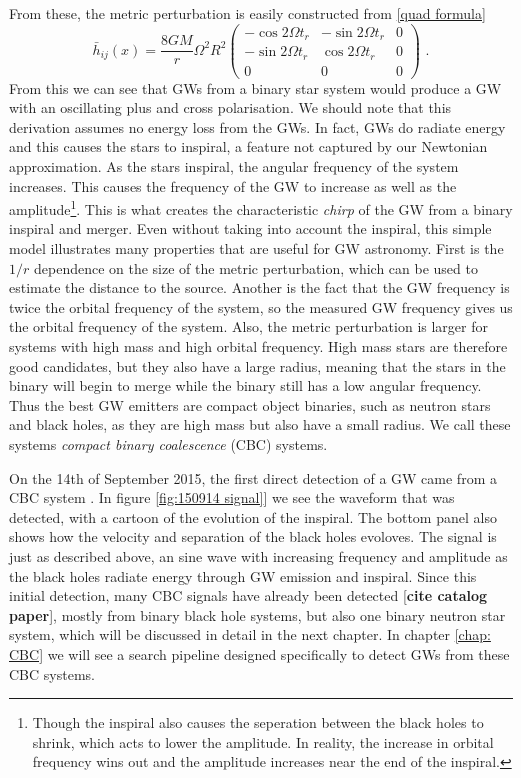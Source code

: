 \documentclass[11pt]{cuthesis}
\newcommand{\fs}{\text{ .}}
\begin{document}
From these, the metric perturbation is easily constructed from \ref{quad formula}
\[
\bar{h}_{ij} (x)
=
\frac{8GM}{r}\Omega^2 R^2\begin{pmatrix} 
 -\cos 2 \Omega t_r & -\sin 2 \Omega t_r & 0 \\
-\sin 2 \Omega t_r & \cos 2 \Omega t_r & 0 \\
0 & 0 & 0
\end{pmatrix}
\fs
\]
From this we can see that GWs from a binary star system would produce a GW with an oscillating plus and cross polarisation. We should note that this derivation assumes no energy loss from the GWs. In fact, GWs do radiate energy and this causes the stars to inspiral, a feature not captured by our Newtonian approximation. As the stars inspiral, the angular frequency of the system increases. This causes the frequency of the GW to increase as well as the amplitude\footnote{Though the inspiral also causes the seperation between the black holes to shrink, which acts to lower the amplitude. In reality, the increase in orbital frequency wins out and the amplitude increases near the end of the inspiral.}. This is what creates the characteristic \textit{chirp} of the GW from a binary inspiral and merger. Even without taking into account the inspiral, this simple model illustrates many properties that are useful for GW astronomy. First is the $1/r$ dependence on the size of the metric perturbation, which can be used to estimate the distance to the source. Another is the fact that the GW frequency is twice the orbital frequency of the system, so the measured GW frequency gives us the orbital frequency of the system. Also, the metric perturbation is larger for systems with high mass and high orbital frequency. High mass stars are therefore good candidates, but they also have a large radius, meaning that the stars in the binary will begin to merge while the binary still has a low angular frequency. Thus the best GW emitters  are compact object binaries, such as neutron stars and black holes, as they are high mass but also have a small radius. We call these systems \textit{compact binary coalescence} (CBC) systems. 

On the 14th of September 2015, the first direct detection of a GW came from a CBC system \cite{150914-det-paper}. In figure \ref{fig:150914 signal}] we see the waveform that was detected, with a cartoon of the evolution of the inspiral. The bottom panel also shows how the velocity and separation of the black holes evoloves. The signal is just as described above, an sine wave with increasing frequency and amplitude as the black holes radiate energy through GW emission and inspiral.  Since this initial detection, many CBC signals have already been detected [\textbf{cite catalog paper}], mostly from binary black hole systems, but also one binary neutron star system, which will be discussed in detail in the next chapter. In chapter \ref{chap: CBC} we will see a search pipeline designed specifically to detect GWs from these CBC systems. 
\end{document}
